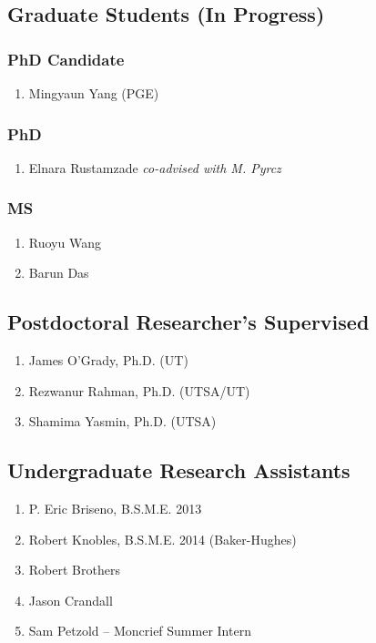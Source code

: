 \subsection*{Graduate Students (In Progress)}

\subsubsection*{PhD Candidate}
\begin{enumerate}
    \item Mingyaun Yang (PGE)
\end{enumerate}


\subsubsection*{PhD}
\begin{enumerate}
    \item Elnara Rustamzade \emph{co-advised with M. Pyrcz}
\end{enumerate}

\subsubsection*{MS}
\begin{enumerate}
    \item Ruoyu Wang 
    \item Barun Das
\end{enumerate}

\subsection*{Postdoctoral Researcher's Supervised}
  \begin{enumerate}
      \item James O'Grady, Ph.D. (UT)
      \item Rezwanur Rahman, Ph.D. (UTSA/UT)
      \item Shamima Yasmin, Ph.D. (UTSA)
  \end{enumerate}

\subsection*{Undergraduate Research Assistants}
  \begin{enumerate}
    \item P. Eric Briseno, B.S.M.E. 2013
    \item Robert Knobles, B.S.M.E. 2014 (Baker-Hughes)
    \item Robert Brothers
    \item Jason Crandall
    \item Sam Petzold -- Moncrief Summer Intern
  \end{enumerate}

